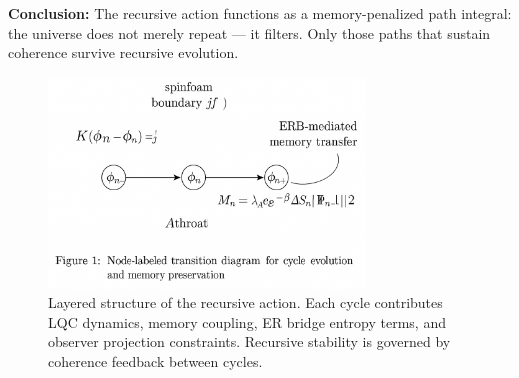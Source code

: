 \textbf{Conclusion:} The recursive action functions as a memory-penalized path integral: the universe does not merely repeat — it filters. Only those paths that sustain coherence survive recursive evolution.

\begin{figure}[H]
\centering
\includegraphics[width=0.75\textwidth]{figures/recursive_action_layers.png}
\caption{Layered structure of the recursive action. Each cycle contributes LQC dynamics, memory coupling, ER bridge entropy terms, and observer projection constraints. Recursive stability is governed by coherence feedback between cycles.}
\label{fig:recursive-action-layers}
\end{figure}
